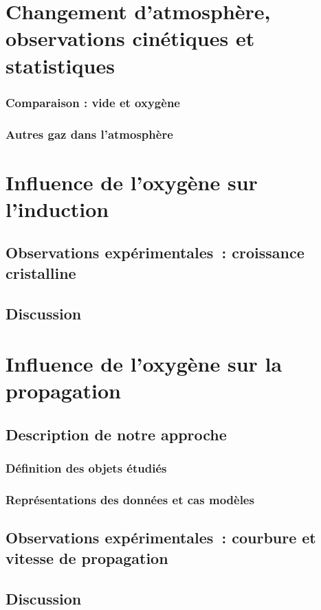 \minitoc
\newpage

\section{Changement d’atmosphère, observations cinétiques et statistiques}
		\subsubsection{Comparaison : vide et oxygène}
		\subsubsection{Autres gaz dans l’atmosphère}
\section{Influence de l'oxygène sur l'induction}
		\subsection{Observations expérimentales~: croissance cristalline}
		\subsection{Discussion}
\section{Influence de l'oxygène sur la propagation}
		\subsection{Description de notre approche}
			\subsubsection{Définition des objets étudiés}
			\subsubsection{Représentations des données et cas modèles}
		\subsection{Observations expérimentales~: courbure et vitesse de propagation}
		\subsection{Discussion}

